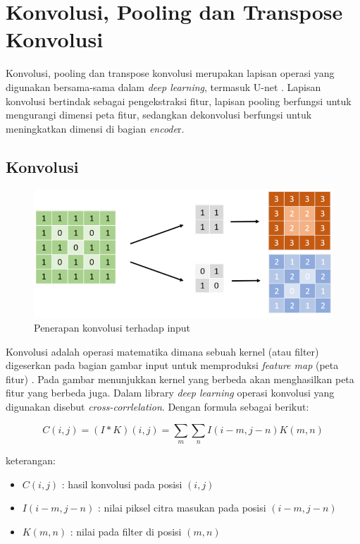 \section{Konvolusi, Pooling dan Transpose Konvolusi}

\noindent Konvolusi, pooling dan transpose konvolusi merupakan lapisan operasi yang digunakan bersama-sama dalam \textit{deep learning}, termasuk U-net \cite{goodfellow_deep_2016,pajankar_convolutional_2022,bishop_deep_2024}.  Lapisan konvolusi bertindak sebagai pengekstraksi fitur, lapisan pooling berfungsi untuk mengurangi dimensi peta fitur, sedangkan dekonvolusi berfungsi untuk meningkatkan dimensi di bagian \textit{encode}r. 

\subsection{Konvolusi}

\begin{figure}[H]
	\centering
	\includegraphics[scale=.6]{gambar/convolusi.png}
	\caption{Penerapan konvolusi terhadap input \cite{huang_fully_2022}}
	\label{fig:convolusi}
\end{figure}

\noindent Konvolusi adalah operasi matematika dimana sebuah kernel (atau filter) digeserkan pada bagian gambar input untuk memproduksi \textit{feature map} (peta fitur) \cite{pajankar_convolutional_2022}.  Pada gambar menunjukkan kernel yang berbeda akan menghasilkan peta fitur yang berbeda juga. Dalam library \textit{deep learning} operasi  konvolusi yang digunakan disebut \textit{cross-corrlelation}\cite{goodfellow_deep_2016}. Dengan formula sebagai berikut:

\begin{equation}
	C(i, j) = (I * K)(i, j) = \sum_{m} \sum_{n} I(i - m, j - n) K(m, n)
\end{equation}


\noindent
keterangan:
\begin{itemize}
	\item $C(i,j)$ : hasil konvolusi pada posisi $(i,j)$
	\item $I(i-m, j-n)$ : nilai piksel citra masukan pada posisi $(i-m, j-n)$
	\item $K(m,n)$ : nilai pada filter di posisi $(m,n)$
\end{itemize}

